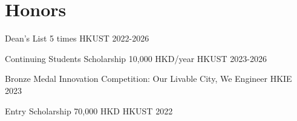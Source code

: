 \section{Honors}
\begin{cvhonors}

\cvhonor
{Dean's List} %
{5 times} %
{HKUST} %
{2022-2026} %

\cvhonor
{Continuing Students Scholarship} %
{10,000 HKD/year} %
{HKUST} %
{2023-2026} %

\cvhonor
{Bronze Medal} %
{Innovation Competition: Our Livable City, We Engineer} %
{HKIE} %
{2023} %

\cvhonor
{Entry Scholarship} %
{70,000 HKD} %
{HKUST} %
{2022} %

\end{cvhonors}